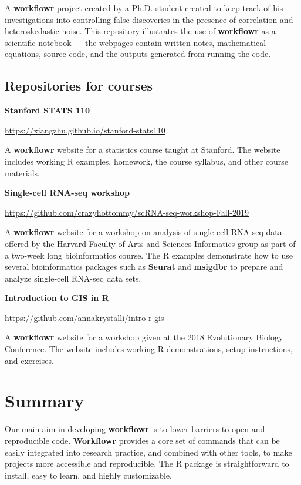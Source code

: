 \documentclass[9pt,a4paper]{extarticle}
\begin{document}
A \textbf{workflowr} project created by a Ph.D. student created to keep track of
his investigations into controlling false discoveries in the presence of
correlation and heteroskedastic noise. This repository illustrates the
use of \textbf{workflowr} as a scientific notebook --- the webpages contain
written notes, mathematical equations, source code, and the outputs
generated from running the code.

\subsection*{Repositories for courses}

\textbf{Stanford STATS 110}

\url{https://xiangzhu.github.io/stanford-stats110}

A \textbf{workflowr} website for a statistics course taught at Stanford. The
website includes working R examples, homework, the course syllabus, and
other course materials.

\textbf{Single-cell RNA-seq workshop}

\url{https://github.com/crazyhottommy/scRNA-seq-workshop-Fall-2019}

A \textbf{workflowr} website for a workshop on analysis of single-cell RNA-seq
data offered by the Harvard Faculty of Arts and Sciences Informatics
group as part of a two-week long bioinformatics course. The R examples
demonstrate how to use several bioinformatics packages such as \textbf{Seurat}
and \textbf{msigdbr} to prepare and analyze single-cell RNA-seq data sets.

\textbf{Introduction to GIS in R}

\url{https://github.com/annakrystalli/intro-r-gis}

A \textbf{workflowr} website for a workshop given at the 2018 Evolutionary
Biology Conference. The website includes working R demonstrations, setup
instructions, and exercises.


\section*{Summary}

Our main aim in developing \textbf{workflowr} is to lower barriers to open and
reproducible code. \textbf{Workflowr} provides a core set of commands that can be
easily integrated into research practice, and combined with other tools,
to make projects more accessible and reproducible. The R package is
straightforward to install, easy to learn, and highly customizable.
\end{document}
